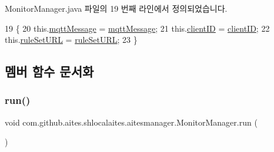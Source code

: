Monitor\+Manager.\+java 파일의 19 번째 라인에서 정의되었습니다.


\begin{DoxyCode}
19                                                                                  \{
20         this.\mbox{\hyperlink{classcom_1_1github_1_1aites_1_1shlocalaites_1_1aitesmanager_1_1_monitor_manager_aa6b372acb4521c7de09fde3877240694}{mqttMessage}} = \mbox{\hyperlink{classcom_1_1github_1_1aites_1_1shlocalaites_1_1aitesmanager_1_1_monitor_manager_aa6b372acb4521c7de09fde3877240694}{mqttMessage}};
21         this.\mbox{\hyperlink{classcom_1_1github_1_1aites_1_1shlocalaites_1_1aitesmanager_1_1_monitor_manager_ac2cb1a60aa97ac0801f4241fb6ac0b14}{clientID}} = \mbox{\hyperlink{classcom_1_1github_1_1aites_1_1shlocalaites_1_1aitesmanager_1_1_monitor_manager_ac2cb1a60aa97ac0801f4241fb6ac0b14}{clientID}};
22         this.\mbox{\hyperlink{classcom_1_1github_1_1aites_1_1shlocalaites_1_1aitesmanager_1_1_monitor_manager_a91d864b58034477cf84abf87943c29a5}{ruleSetURL}} = \mbox{\hyperlink{classcom_1_1github_1_1aites_1_1shlocalaites_1_1aitesmanager_1_1_monitor_manager_a91d864b58034477cf84abf87943c29a5}{ruleSetURL}};
23     \}
\end{DoxyCode}


\subsection{멤버 함수 문서화}
\mbox{\label{classcom_1_1github_1_1aites_1_1shlocalaites_1_1aitesmanager_1_1_monitor_manager_ab023eb072c881dd163cbd5c97d5bd7d1}} 
\subsubsection{\texorpdfstring{run()}{run()}}
{\footnotesize\ttfamily void com.\+github.\+aites.\+shlocalaites.\+aitesmanager.\+Monitor\+Manager.\+run (\begin{DoxyParamCaption}{ }\end{DoxyParamCaption})}



